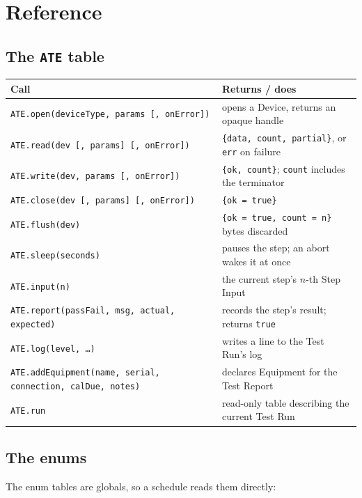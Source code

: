 \chapter{Reference}\label{ch:reference}

\section{The \texttt{ATE} table}

\begin{center}
\footnotesize
\begin{tabular}{@{}>{\raggedright\arraybackslash}p{5.6cm}>{\raggedright\arraybackslash}p{9.4cm}@{}}
\toprule
Call & Returns / does \\
\midrule
\texttt{ATE.open(deviceType, params [, onError])} & opens a Device, returns an opaque handle \\
\texttt{ATE.read(dev [, params] [, onError])} & \texttt{\{data, count, partial\}}, or
  \texttt{err} on failure \\
\texttt{ATE.write(dev, params [, onError])} & \texttt{\{ok, count\}}; \texttt{count} includes
  the terminator \\
\texttt{ATE.close(dev [, params] [, onError])} & \texttt{\{ok = true\}} \\
\texttt{ATE.flush(dev)} & \texttt{\{ok = true, count = n\}} bytes discarded \\
\texttt{ATE.sleep(seconds)} & pauses the step; an abort wakes it at once \\
\texttt{ATE.input(n)} & the current step's $n$-th Step Input \\
\texttt{ATE.report(passFail, msg, actual, expected)} & records the step's result; returns
  \texttt{true} \\
\texttt{ATE.log(level, \dots)} & writes a line to the Test Run's log \\
\texttt{ATE.addEquipment(name, serial, connection, calDue, notes)} & declares Equipment for the
  Test Report \\
\texttt{ATE.run} & read-only table describing the current Test Run \\
\bottomrule
\end{tabular}
\end{center}

\section{The enums}

The enum tables are globals, so a schedule reads them directly:

